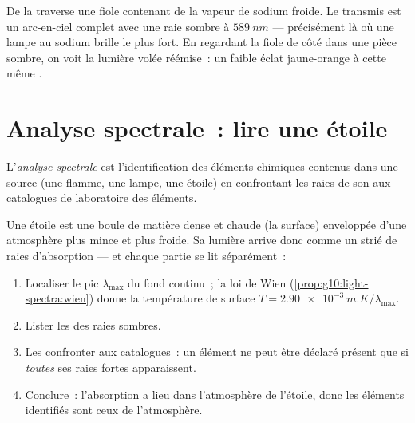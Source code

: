 \begin{example}\label{ex:g10:light-spectra:sodiumflask}
De la  traverse une fiole contenant de la vapeur de
sodium froide. Le  transmis est un arc-en-ciel complet avec une
raie sombre à $\qty{589}{nm}$ --- précisément là où une lampe au sodium
brille le plus fort. En regardant la fiole de côté dans une pièce
sombre, on voit la lumière volée réémise~: un faible éclat jaune-orange
à cette même .
\end{example}

\section{Analyse spectrale~: lire une étoile}

\begin{definition}\label{def:g10:light-spectra:analysis}
L'\emph{analyse spectrale} est l'identification
des éléments chimiques contenus dans une source (une flamme, une lampe,
une étoile) en confrontant les raies de son  aux catalogues de
laboratoire des éléments.
\end{definition}

\begin{method}\label{met:g10:light-spectra:reading}
Une étoile est une boule de matière dense et chaude (la surface)
enveloppée d'une atmosphère plus mince et plus froide. Sa lumière
arrive donc comme un  strié de raies d'absorption
--- et chaque partie se lit séparément~:
\begin{enumerate}
  \item Localiser le pic $\lambda_{\max}$ du fond continu~; la loi de
        Wien (\cref{prop:g10:light-spectra:wien}) donne la température
        de surface $T = \qty{2.90e-3}{m.K} / \lambda_{\max}$.
  \item Lister les  des raies sombres.
  \item Les confronter aux catalogues~: un élément ne peut être déclaré
        présent que si \emph{toutes} ses raies fortes apparaissent.
  \item Conclure~: l'absorption a lieu dans l'atmosphère de l'étoile,
        donc les éléments identifiés sont ceux de l'atmosphère.
\end{enumerate}
\end{method}

